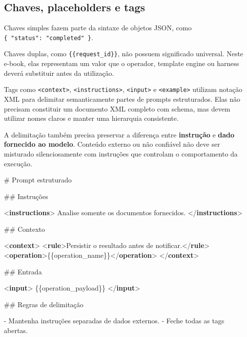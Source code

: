 \documentclass[
  10pt,
  a4paper,
  oneside]{book}
\newenvironment{Shaded}{}{}
\newcommand{\DataTypeTok}[1]{\textcolor[rgb]{0.56,0.13,0.00}{#1}}
\newcommand{\FunctionTok}[1]{\textcolor[rgb]{0.02,0.16,0.49}{#1}}
\newcommand{\KeywordTok}[1]{\textcolor[rgb]{0.00,0.44,0.13}{\textbf{#1}}}
\newcommand{\NormalTok}[1]{#1}
\newcommand{\SpecialStringTok}[1]{\textcolor[rgb]{0.73,0.40,0.53}{#1}}
\renewenvironment{Shaded}{\begin{snugshade}}{\end{snugshade}}%
\begin{document}
\hypertarget{chaves-placeholders-e-tags}{%
\subsection{Chaves, placeholders e
tags}\label{chaves-placeholders-e-tags}}

Chaves simples fazem parte da sintaxe de objetos JSON, como
\texttt{\{\ "status":\ "completed"\ \}}.

Chaves duplas, como \texttt{\{\{request\_id\}\}}, não possuem
significado universal. Neste e-book, elas representam um valor que o
operador, template engine ou harness deverá substituir antes da
utilização.

Tags como \texttt{\textless{}context\textgreater{}},
\texttt{\textless{}instructions\textgreater{}},
\texttt{\textless{}input\textgreater{}} e
\texttt{\textless{}example\textgreater{}} utilizam notação XML para
delimitar semanticamente partes de prompts estruturados. Elas não
precisam constituir um documento XML completo com schema, mas devem
utilizar nomes claros e manter uma hierarquia consistente.

A delimitação também precisa preservar a diferença entre
\textbf{instrução} e \textbf{dado fornecido ao modelo}. Conteúdo externo
ou não confiável não deve ser misturado silenciosamente com instruções
que controlam o comportamento da execução.

\begin{Shaded}
\begin{Highlighting}[]
\FunctionTok{\# Prompt estruturado}

\FunctionTok{\#\# Instruções}

\DataTypeTok{\textless{}}\KeywordTok{instructions}\DataTypeTok{\textgreater{}}
\NormalTok{Analise somente os documentos fornecidos.}
\DataTypeTok{\textless{}/}\KeywordTok{instructions}\DataTypeTok{\textgreater{}}

\FunctionTok{\#\# Contexto}

\DataTypeTok{\textless{}}\KeywordTok{context}\DataTypeTok{\textgreater{}}
  \DataTypeTok{\textless{}}\KeywordTok{rule}\DataTypeTok{\textgreater{}}\NormalTok{Persistir o resultado antes de notificar.}\DataTypeTok{\textless{}/}\KeywordTok{rule}\DataTypeTok{\textgreater{}}
  \DataTypeTok{\textless{}}\KeywordTok{operation}\DataTypeTok{\textgreater{}}\NormalTok{\{\{operation\_name\}\}}\DataTypeTok{\textless{}/}\KeywordTok{operation}\DataTypeTok{\textgreater{}}
\DataTypeTok{\textless{}/}\KeywordTok{context}\DataTypeTok{\textgreater{}}

\FunctionTok{\#\# Entrada}

\DataTypeTok{\textless{}}\KeywordTok{input}\DataTypeTok{\textgreater{}}
\NormalTok{\{\{operation\_payload\}\}}
\DataTypeTok{\textless{}/}\KeywordTok{input}\DataTypeTok{\textgreater{}}

\FunctionTok{\#\# Regras de delimitação}

\SpecialStringTok{{-} }\NormalTok{Mantenha instruções separadas de dados externos.}
\SpecialStringTok{{-} }\NormalTok{Feche todas as tags abertas.}
\end{Highlighting}
\end{Shaded}
\end{document}

